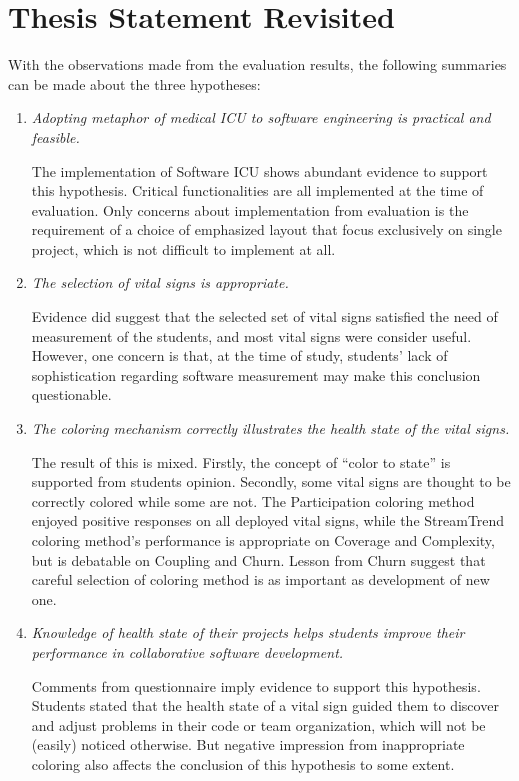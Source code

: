 \section {Thesis Statement Revisited}
With the observations made from the evaluation results, the following summaries can be made about the three hypotheses:
\begin{enumerate}
\item {\it Adopting metaphor of medical ICU to software engineering is practical and feasible.}

The implementation of Software ICU shows abundant evidence to support this hypothesis. Critical functionalities are all implemented at the time of evaluation. Only concerns about implementation from evaluation is the requirement of a choice of emphasized layout that focus  exclusively on single project, which is not difficult to implement at all.
\item {\it The selection of vital signs is appropriate.}

Evidence did suggest that the selected set of vital signs satisfied the need of measurement of the students, and most vital signs were consider useful. However, one concern is that, at the time of study, students' lack of sophistication regarding software measurement may make this conclusion questionable.
\item {\it The coloring mechanism correctly illustrates the health state of the vital signs.}

The result of this is mixed. Firstly, the concept of ``color to state'' is supported from students opinion. Secondly, some vital signs are thought to be correctly colored while some are not. The Participation coloring method enjoyed positive responses on all deployed vital signs, while the StreamTrend coloring method's performance is appropriate on Coverage and Complexity, but is debatable on Coupling and Churn. Lesson from Churn suggest that careful selection of coloring method is as important as development of new one.
\item {\it Knowledge of health state of their projects helps students improve their performance in collaborative software development.}

Comments from questionnaire imply evidence to support this hypothesis. Students stated that the health state of a vital sign guided them to discover and adjust problems in their code or team organization, which will not be (easily) noticed otherwise. But negative impression from inappropriate coloring also affects the conclusion of this hypothesis to some extent. 
\end{enumerate}

